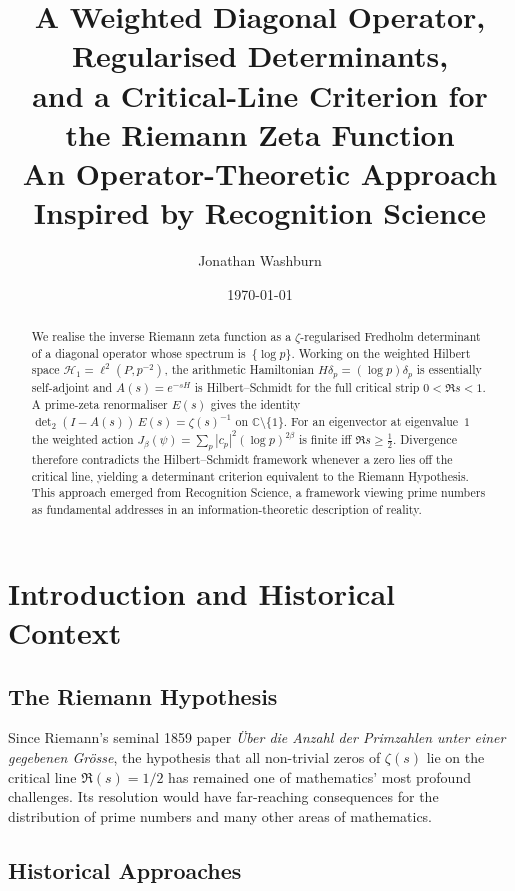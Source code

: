 \documentclass[12pt]{article}
\title{A Weighted Diagonal Operator, Regularised Determinants,\\
and a Critical-Line Criterion for the Riemann Zeta Function\\[0.5em]
\large{An Operator-Theoretic Approach Inspired by Recognition Science}}
\author{Jonathan Washburn}
\date{\today}
\theoremstyle{definition}
\theoremstyle{remark}
\newcommand{\Hspace}{\mathcal H}
\begin{document}
\maketitle

\begin{abstract}
We realise the inverse Riemann zeta function as a $\zeta$-regularised Fredholm
determinant of a diagonal operator whose spectrum is~\(\{\log p\}\).
Working on the weighted Hilbert space
\(\Hspace_{1}=\ell^{2}(P,p^{-2})\),
the arithmetic Hamiltonian
\(H\delta_{p}=(\log p)\delta_{p}\) is essentially self-adjoint and
\(A(s)=e^{-sH}\) is Hilbert--Schmidt for the full critical strip
\(0<\Re s<1\).
A prime-zeta renormaliser \(E(s)\) gives the identity
\(\det_{2}(I-A(s))\,E(s)=\zeta(s)^{-1}\) on \(\mathbb C\setminus\{1\}\).
For an eigenvector at eigenvalue~\(1\) the weighted action
\(J_\beta(\psi)=\sum_p|c_p|^{2}(\log p)^{2\beta}\)
is finite iff \(\Re s\ge\tfrac12\).
Divergence therefore contradicts the Hilbert--Schmidt framework
whenever a zero lies off the critical line, yielding a determinant
criterion equivalent to the Riemann Hypothesis.
This approach emerged from Recognition Science, a framework viewing prime numbers
as fundamental addresses in an information-theoretic description of reality.
\end{abstract}

\tableofcontents

\section{Introduction and Historical Context}

\subsection{The Riemann Hypothesis}

Since Riemann's seminal 1859 paper \emph{\"Uber die Anzahl der Primzahlen unter 
einer gegebenen Gr\"osse}, the hypothesis that all non-trivial zeros of 
$\zeta(s)$ lie on the critical line $\Re(s) = 1/2$ has remained one of 
mathematics' most profound challenges. Its resolution would have far-reaching 
consequences for the distribution of prime numbers and many other areas of 
mathematics.

\subsection{Historical Approaches}
\end{document}
